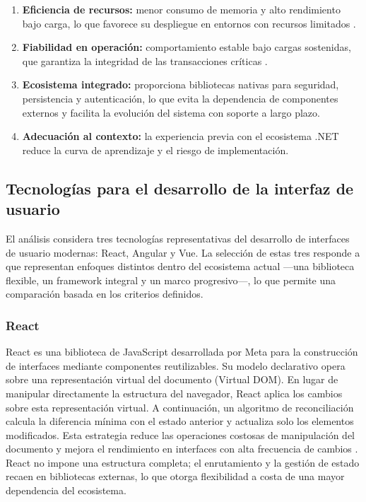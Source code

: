 \begin{enumerate}
    \item \textbf{Eficiencia de recursos:} menor consumo de memoria y alto rendimiento bajo carga, lo que favorece su despliegue en entornos con recursos limitados \cite{performance_study}.
    \item \textbf{Fiabilidad en operación:} comportamiento estable bajo cargas sostenidas, que garantiza la integridad de las transacciones críticas \cite{performance_study}.
    \item \textbf{Ecosistema integrado:} proporciona bibliotecas nativas para seguridad, persistencia y autenticación, lo que evita la dependencia de componentes externos y facilita la evolución del sistema con soporte a largo plazo.
    \item \textbf{Adecuación al contexto:} la experiencia previa con el ecosistema .NET reduce la curva de aprendizaje y el riesgo de implementación.
\end{enumerate}

\subsection{Tecnologías para el desarrollo de la interfaz de usuario}
\label{subsection:frontend}

El análisis considera tres tecnologías representativas del desarrollo de interfaces de usuario modernas: React, Angular y Vue. La selección de estas tres responde a que representan enfoques distintos dentro del ecosistema actual —una biblioteca flexible, un framework integral y un marco progresivo—, lo que permite una comparación basada en los criterios definidos.

\subsubsection{React}

React es una biblioteca de JavaScript desarrollada por Meta para la construcción de interfaces mediante componentes reutilizables. 
Su modelo declarativo opera sobre una representación virtual del documento (Virtual DOM). En lugar de manipular directamente la estructura del navegador, React aplica los cambios sobre esta representación virtual. A continuación, un algoritmo de reconciliación calcula la diferencia mínima con el estado anterior y actualiza solo los elementos modificados.
Esta estrategia reduce las operaciones costosas de manipulación del documento y mejora el rendimiento en interfaces con alta frecuencia de cambios \cite{react_official}. 
React no impone una estructura completa; el enrutamiento y la gestión de estado recaen en bibliotecas externas, lo que otorga flexibilidad a costa de una mayor dependencia del ecosistema.


